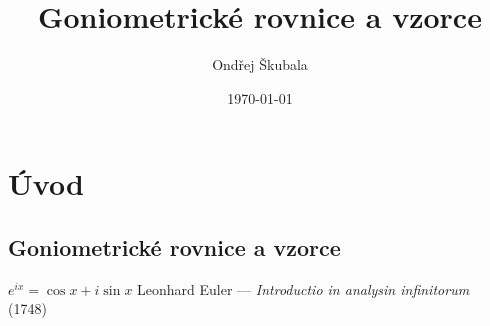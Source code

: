 \documentclass[12pt,a4paper]{article}
\title{Goniometrické rovnice a vzorce}
\author{Ondřej Škubala}
\date{\today}
\begin{document}
\maketitle
\newpage

\section{Úvod}

\subsection*{Goniometrické rovnice a vzorce}

\begin{quotebox}
{$e^{ix} = \cos x + i\sin x$}
{Leonhard Euler — \textit{Introductio in analysin infinitorum} (1748)}
\end{quotebox}
\end{document}
